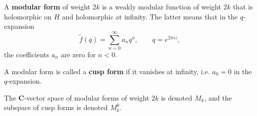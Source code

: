 A \textbf{modular form} of weight $2k$ is a weakly modular function of weight $2k$ that is holomorphic on $H$ and holomorphic at infinity. The latter means that in the $q$-expansion
$$\tilde{f}(q) = \sum_{n=0}^{\infty} a_n q^n, \qquad q = e^{2\pi i z},$$
the coefficients $a_n$ are zero for $n < 0$.

A modular form is called a \textbf{cusp form} if it vanishes at infinity, i.e. $a_0 = 0$ in the $q$-expansion.

The $\mathbf{C}$-vector space of modular forms of weight $2k$ is denoted $M_k$, and the subspace of cusp forms is denoted $M_k^0$.
